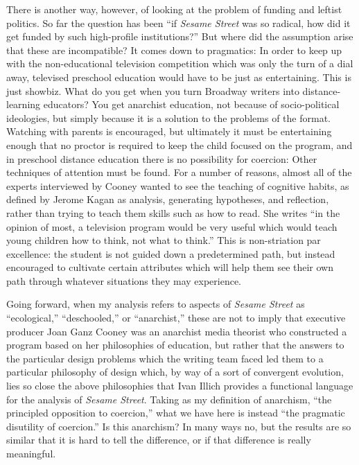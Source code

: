 \documentclass[12pt,letterpaper]{article}
\newcommand{\ses}{\textit{Sesame Street }}
\begin{document}
	There is another 
	way, however, of looking at the problem of funding and leftist politics.
	So far the question has been ``if \ses was so 
	radical, how did it get funded by such high-profile institutions?'' But
	where did the assumption arise that these are incompatible? It comes 
	down to pragmatics: In order to keep up with the non-educational 
	television competition which was only the turn of a dial away, televised
	preschool education would have to be just as 
	entertaining.\autocite[38]{Cooney} This is just showbiz. What do you get
	when you turn Broadway writers into distance-learning educators? You get
	anarchist education, not because of socio-political ideologies, but 
	simply because it is a solution to the problems of the format. Watching 
	with parents is encouraged, but ultimately it must be entertaining 
	enough that no proctor is required to keep the child focused on the 
	program, and in preschool distance education there is no possibility for
	coercion: Other techniques of attention must be found. For a number of 
	reasons, almost all of the experts interviewed by Cooney wanted to see 
	the teaching of cognitive habits, as defined by Jerome Kagan as 
	analysis, generating hypotheses, and reflection, rather than trying to 
	teach them skills such as how to read. She writes 
	``in the opinion of most, a television program would be very useful 
	which would teach young children how to think, not what to 
	think.''\autocite[23]{Cooney} This is non-striation par excellence: the
	student is not guided down a 
	predetermined path, but instead encouraged to cultivate certain 
	attributes which will help them see their own path through whatever 
	situations they may experience.

	Going forward, when my analysis refers to aspects of \ses as 
	``ecological,'' ``deschooled,'' or ``anarchist,'' these are not to imply
	that executive producer Joan Ganz Cooney was an anarchist media theorist
	who 
	constructed a program based on her philosophies of education, but rather 
	that the answers to the particular design problems which the writing 
	team faced led them to a particular philosophy of design which, by way 	
	of a sort of convergent evolution, lies so close the above philosophies 
	that Ivan Illich provides a functional language for the analysis of 
	\textit{Sesame Street}.
	Taking as my definition of anarchism, ``the principled opposition to 
	coercion,'' what we have here is instead ``the pragmatic disutility of 
	coercion.'' Is this anarchism? In many ways no, but the results 
	are so similar that it is hard to tell the difference, or if that 
	difference is really meaningful.
\end{document}
